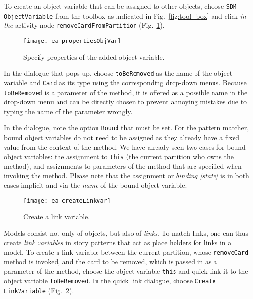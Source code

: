 To create an object variable that can be assigned to other objects, choose \texttt{SDM ObjectVariable} from the toolbox as indicated in Fig.~\ref{fig:tool_box}
and click \emph{in the} activity node \texttt{removeCardFromPartition} (Fig.~\ref{fig:object_variable_properties}).

\begin{figure}[htp]
\begin{center}
  \texttt{[image: ea\_propertiesObjVar]}
  \caption{Specify properties of the added object variable.}  
  \label{fig:object_variable_properties}
\end{center}
\end{figure}

In the dialogue that pops up, choose \texttt{toBeRemoved} as the name of the object variable and \texttt{Card} as its type using the corresponding drop-down
menus. Because \texttt{toBeRemoved} is a parameter of the method, it is offered as a possible name in the drop-down menu and can be directly chosen to prevent
annoying mistakes due to typing the name of the parameter wrongly.

In the dialogue, note the option \texttt{Bound} that must be set. For the pattern matcher, bound object variables do not need to be assigned as they already
have a fixed value from the context of the method.   We have already seen two cases  for bound object variables: the assignment to \texttt{this} (the current 
partition who owns the method), and assignments to parameters of the  method that  are specified when invoking the method.   Please note
that the assignment or \emph{binding [state]} is in both cases implicit and via the \emph{name} of the bound object variable.

\begin{figure}[htp]
\begin{center}
  \texttt{[image: ea\_createLinkVar]}
  \caption{Create a link variable.}   
  \label{fig:link_variable}
\end{center}
\end{figure}

Models consist not only of objects, but also of \emph{links}. To match links, one can thus create \emph{link variables} in story patterns that act as place
 holders for links in a model. To create a link variable between the current partition, whose \texttt{removeCard} method is invoked, and the
card to be removed, which is passed in as a parameter of the method, choose the object variable \texttt{this} and quick link it to the object variable
\texttt{toBeRemoved}. In the quick link dialogue, choose \texttt{Create LinkVariable} (Fig.~\ref{fig:link_variable}).

